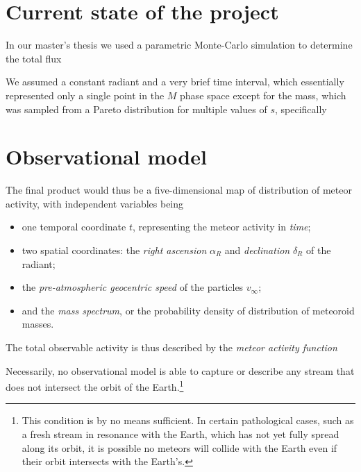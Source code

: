 \section{Current state of the project} \label{pc}
    In our master's thesis \citep{balaz-thesis} we used a parametric Monte-Carlo simulation
    to determine the total flux 

    We assumed a constant radiant and a very brief time interval,
    which essentially represented only a single point in the $M$ phase space
    except for the mass, which was sampled from a Pareto distribution for multiple values of $s$,
    specifically

\section{Observational model} \label{ps}
    The final product would thus be a five-dimensional map of distribution of meteor activity, with independent variables being
    \begin{itemize}
        \item one temporal coordinate $t$, representing the meteor activity in \emph{time};
        \item two spatial coordinates: the \emph{right ascension} $\alpha_R$ and \emph{declination} $\delta_R$ of the radiant;
        \item the \emph{pre-atmospheric geocentric speed} of the particles $v_\infty$;
        \item and the \emph{mass spectrum}, or the probability density of distribution of meteoroid masses.
    \end{itemize}

    The total observable activity is thus described by the \emph{meteor activity function}

    Necessarily, no observational model is able to capture or describe any stream that does not intersect the orbit of the
    Earth.\footnote{This condition is by no means sufficient. In certain pathological cases, such as a fresh stream in resonance
    with the Earth, which has not yet fully spread along its orbit, it is possible no meteors will collide with the Earth even
    if their orbit intersects with the Earth's.}

